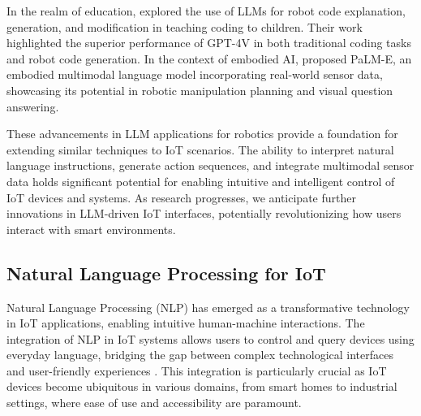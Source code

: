 \documentclass{ieeeaccess}
\begin{document}
In the realm of education, \cite{shu2024llmscodingroboticseducation} explored the use of LLMs for robot code explanation, generation, and modification in teaching coding to children. Their work highlighted the superior performance of GPT-4V in both traditional coding tasks and robot code generation. In the context of embodied AI, \cite{10.5555/3618408.3618748} proposed PaLM-E, an embodied multimodal language model incorporating real-world sensor data, showcasing its potential in robotic manipulation planning and visual question answering.





These advancements in LLM applications for robotics provide a foundation for extending similar techniques to IoT scenarios. The ability to interpret natural language instructions, generate action sequences, and integrate multimodal sensor data holds significant potential for enabling intuitive and intelligent control of IoT devices and systems. As research progresses, we anticipate further innovations in LLM-driven IoT interfaces, potentially revolutionizing how users interact with smart environments.

\subsection{Natural Language Processing for IoT}
Natural Language Processing (NLP) has emerged as a transformative technology in IoT applications, enabling intuitive human-machine interactions. The integration of NLP in IoT systems allows users to control and query devices using everyday language, bridging the gap between complex technological interfaces and user-friendly experiences \cite{10.1145/3643505}. This integration is particularly crucial as IoT devices become ubiquitous in various domains, from smart homes to industrial settings, where ease of use and accessibility are paramount.
\end{document}
